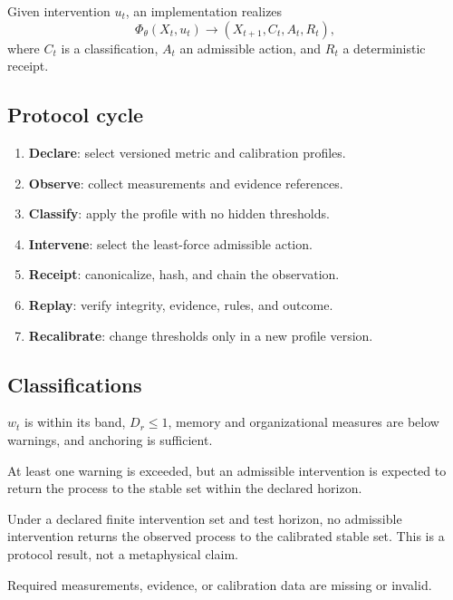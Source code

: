 \documentclass[11pt]{article}
\begin{document}
Given intervention $u_t$, an implementation realizes
\begin{equation}
\Phi_\theta(X_t,u_t)
\longrightarrow
\left(X_{t+1},C_t,A_t,R_t\right),
\label{eq:transition}
\end{equation}
where $C_t$ is a classification, $A_t$ an admissible action, and $R_t$ a
deterministic receipt.

\subsection{Protocol cycle}

\begin{enumerate}
  \item \textbf{Declare}: select versioned metric and calibration profiles.
  \item \textbf{Observe}: collect measurements and evidence references.
  \item \textbf{Classify}: apply the profile with no hidden thresholds.
  \item \textbf{Intervene}: select the least-force admissible action.
  \item \textbf{Receipt}: canonicalize, hash, and chain the observation.
  \item \textbf{Replay}: verify integrity, evidence, rules, and outcome.
  \item \textbf{Recalibrate}: change thresholds only in a new profile version.
\end{enumerate}

\subsection{Classifications}

\begin{description}[leftmargin=30mm,style=nextline]
  \item[Governable]
    $w_t$ is within its band, $D_r\leq1$, memory and organizational measures are
    below warnings, and anchoring is sufficient.
  \item[Critical]
    At least one warning is exceeded, but an admissible intervention is
    expected to return the process to the stable set within the declared
    horizon.
  \item[Irreversible]
    Under a declared finite intervention set and test horizon, no admissible
    intervention returns the observed process to the calibrated stable set.
    This is a protocol result, not a metaphysical claim.
  \item[Indeterminate]
    Required measurements, evidence, or calibration data are missing or
    invalid.
\end{description}
\end{document}
